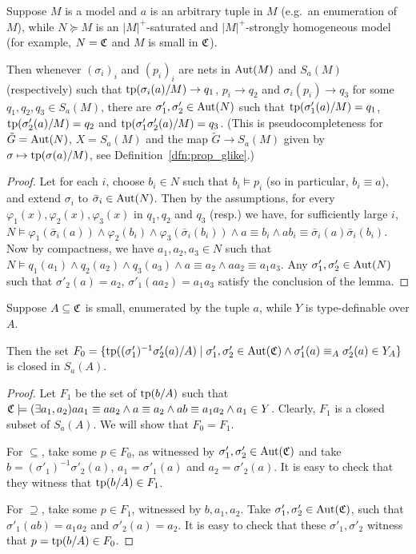 	\begin{lem}
		\label{lem:pseudocompleteness_for_aut}
		Suppose $M$ is a model and $a$ is an arbitrary tuple in $M$ (e.g.\ an enumeration of $M$), while $N\succeq M$ is an $\lvert M\rvert^+$-saturated and $\lvert M\rvert^+$-strongly homogeneous model (for example, $N={\mathfrak C}$ and $M$ is small in ${\mathfrak C}$).
		
		Then whenever $(\sigma_i)_i$ and $(p_i)_i$ are nets in $\operatorname{{Aut}}(M)$ and $S_a(M)$ (respectively) such that $\operatorname{{tp}}(\sigma_i(a)/M)\to q_1$, $p_i\to q_2$ and $\sigma_i(p_i)\to q_3$ for some $q_1,q_2,q_3\in S_a(M)$, there are $\sigma'_1,\sigma'_2\in \operatorname{{Aut}}(N)$ such that $\operatorname{{tp}}(\sigma'_1(a)/M)=q_1$, $\operatorname{{tp}}(\sigma'_2(a)/M)=q_2$ and $\operatorname{{tp}}(\sigma'_1\sigma'_2(a)/M)=q_3$. (This is pseudocompleteness for $\tilde G=\operatorname{{Aut}}(N)$, $X=S_a(M)$ and the map $\tilde G\to S_a(M)$ given by $\sigma\mapsto \operatorname{{tp}}(\sigma(a)/M)$, see Definition~\ref{dfn:prop_glike}.)
	\end{lem}
	\begin{proof}
		Let for each $i$, choose $b_i\in N$ such that $b_i\models p_i$ (so in particular, $b_i\equiv a$), and extend $\sigma_i$ to $\bar\sigma_i\in \operatorname{{Aut}}(N)$. Then by the assumptions, for every $\varphi_1(x),\varphi_2(x),\varphi_3(x)$ in $q_1,q_2$ and $q_3$ (resp.) we have, for sufficiently large $i$, $N\models \varphi_1(\bar \sigma_i(a))\land \varphi_2(b_i)\land \varphi_3(\bar\sigma_i(b_i))\land a\equiv b_i\land ab_i\equiv \bar\sigma_i(a)\bar\sigma_i(b_i)$. Now by compactness, we have $a_1,a_2,a_3\in N$ such that $N\models q_1(a_1)\land q_2(a_2)\land q_3(a_3)\land a\equiv a_2\land aa_2\equiv a_1a_3$. Any $\sigma'_1, \sigma'_2\in \operatorname{{Aut}}(N)$ such that $\sigma'_2(a)=a_2$, $\sigma'_1(aa_2)=a_1a_3$ satisfy the conclusion of the lemma.
	\end{proof}
	
	\begin{lem}
		\label{lem:F_0_for_aut}
		Suppose $A\subseteq {\mathfrak C}$ is small, enumerated by the tuple $a$, while $Y$ is type-definable over $A$.
		
		Then the set $F_0=\{\operatorname{{tp}}((\sigma'_1)^{-1}\sigma'_2(a)/A) \mid \sigma'_1,\sigma_2'\in \operatorname{{Aut}}({\mathfrak C})\land \sigma'_1(a)\equiv_A \sigma'_2(a)\in Y_A \}$ is closed in $S_a(A)$.
	\end{lem}
	\begin{proof}
		Let $F_1$ be the set of $\operatorname{{tp}}(b/A)$ such that ${\mathfrak C}\models(\exists a_1,a_2) aa_1\equiv aa_2\land a\equiv a_2\land ab\equiv a_1a_2\land a_1\in Y$. Clearly, $F_1$ is a closed subset of $S_a(A)$. We will show that $F_0=F_1$.
		
		For $\subseteq$, take some $p\in F_0$, as witnessed by $\sigma'_1,\sigma'_2\in \operatorname{{Aut}}({\mathfrak C})$ and take $b=(\sigma'_1)^{-1}\sigma'_2(a)$, $a_1=\sigma'_1(a)$ and $a_2=\sigma'_2(a)$. It is easy to check that they witness that $\operatorname{{tp}}(b/A)\in F_1$.
		
		For $\supseteq$, take some $p\in F_1$, witnessed by $b,a_1,a_2$. Take $\sigma_1',\sigma'_2\in \operatorname{{Aut}}({\mathfrak C})$, such that $\sigma'_1(ab)=a_1a_2$ and $\sigma'_2(a)=a_2$. It is easy to check that these $\sigma'_1,\sigma'_2$ witness that $p=\operatorname{{tp}}(b/A)\in F_0$.
	\end{proof}
	
